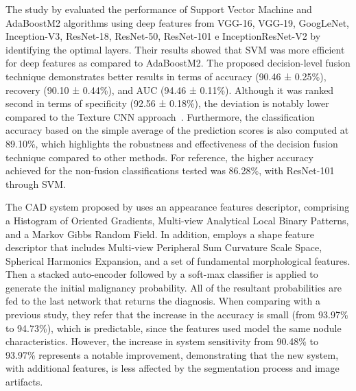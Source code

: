 The study by \citet{Ali2021} evaluated the performance of Support Vector Machine and AdaBoostM2 algorithms using deep features from VGG-16, VGG-19, GoogLeNet, Inception-V3, ResNet-18, ResNet-50, ResNet-101 e InceptionResNet-V2 by identifying the optimal layers. Their results showed that SVM was more efficient for deep features as compared to AdaBoostM2. The proposed decision-level fusion technique demonstrates better results in terms of accuracy (90.46 ± 0.25\%), recovery (90.10 ± 0.44\%), and AUC (94.46 ± 0.11\%). Although it was ranked second in terms of specificity (92.56 ± 0.18\%), the deviation is notably lower compared to the Texture CNN approach~\cite{Ali2020}. Furthermore, the classification accuracy based on the simple average of the prediction scores is also computed at 89.10\%, which highlights the robustness and effectiveness of the decision fusion technique compared to other methods. For reference, the  higher accuracy achieved for the non-fusion classifications tested was 86.28\%, with ResNet-101 through SVM.


The CAD system proposed by \citet{Shaffie2022} uses an appearance features descriptor, comprising a Histogram of Oriented Gradients, Multi-view Analytical Local Binary Patterns, and a Markov Gibbs Random Field. In addition, employs a shape feature descriptor that includes Multi-view Peripheral Sum Curvature Scale Space, Spherical Harmonics Expansion, and a set of fundamental morphological features. Then a stacked auto-encoder followed by a soft-max classifier is applied to generate the initial malignancy probability. All of the resultant probabilities are fed to the last network that returns the diagnosis. When comparing with a previous study, they refer that the increase in the accuracy is small (from 93.97\% to 94.73\%), which is predictable, since the features used model the same nodule characteristics. However, the increase in system sensitivity from 90.48\% to 93.97\% represents a notable improvement, demonstrating that the new system, with additional features, is less affected by the segmentation process and image artifacts.




